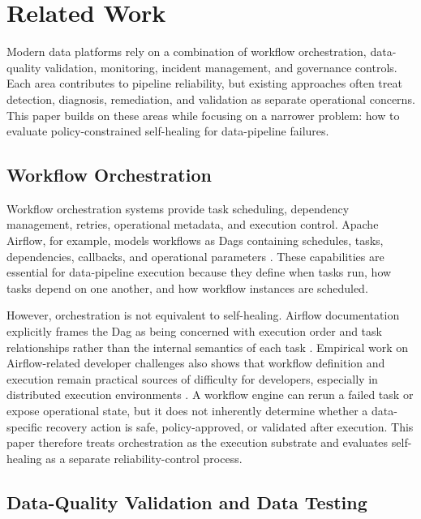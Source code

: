 \section{Related Work}

Modern data platforms rely on a combination of workflow orchestration, data-quality validation, monitoring, incident management, and governance controls. Each area contributes to pipeline reliability, but existing approaches often treat detection, diagnosis, remediation, and validation as separate operational concerns. This paper builds on these areas while focusing on a narrower problem: how to evaluate policy-constrained self-healing for data-pipeline failures.

\subsection{Workflow Orchestration}


Workflow orchestration systems provide task scheduling, dependency management, retries, operational metadata, and execution control. Apache Airflow, for example, models workflows as Dags containing schedules, tasks, dependencies, callbacks, and operational parameters \cite{apacheairflowdags2026}. These capabilities are essential for data-pipeline execution because they define when tasks run, how tasks depend on one another, and how workflow instances are scheduled.

However, orchestration is not equivalent to self-healing. Airflow documentation explicitly frames the Dag as being concerned with execution order and task relationships rather than the internal semantics of each task \cite{apacheairflowdags2026}. Empirical work on Airflow-related developer challenges also shows that workflow definition and execution remain practical sources of difficulty for developers, especially in distributed execution environments \cite{yasmin2024airflow}. A workflow engine can rerun a failed task or expose operational state, but it does not inherently determine whether a data-specific recovery action is safe, policy-approved, or validated after execution. This paper therefore treats orchestration as the execution substrate and evaluates self-healing as a separate reliability-control process.

\subsection{Data-Quality Validation and Data Testing}


